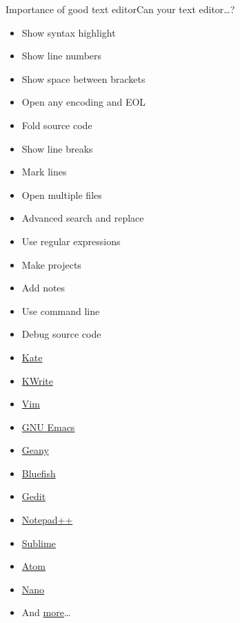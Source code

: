 \documentclass[compress, ucs, xelatex, 11pt, xcolor=svgnames,
  hyperref={
    bookmarks=true,
    unicode=true,
    colorlinks=true,
    pdftitle={Linux, command line and MetaCentrum},
    plainpages=false,
    pdfauthor={Vojtech Zeisek},
    pdfsubject={Course about use of Linux command line, writing shell scripts and using MetaCentrum of CESNET},
    pdfcreator={XeLaTeX},
    pdfkeywords={Linux, GNU, BASH, shell, command line, MetaCentrum},
    linkcolor=DarkRed,
    anchorcolor=DarkBlue,
    citecolor=Indigo,
    filecolor=NavyBlue,
    menucolor=DarkMagenta,
    urlcolor=DarkBlue,
    pdftex},
  url={hyphens, lowtilde} %
  ]{beamer}
\begin{document}
\begin{frame}[label=editors]{Importance of good text editor}{Can your text editor\ldots ?}
\begin{multicols}{2}
  \begin{itemize}
    \item Show syntax highlight
    \item Show line numbers
    \item Show space between brackets
    \item Open any encoding and EOL
    \item Fold source code
    \item Show line breaks
    \item Mark lines
    \item Open multiple files
    \item Advanced search and replace
    \item Use regular expressions
    \item Make projects
    \item Add notes
    \item Use command line
    \item Debug source code
  \end{itemize}
\end{multicols}
\begin{multicols}{4}
  \begin{itemize}
    \item \href{http://kate-editor.org/}{Kate}
    \item \href{https://www.kde.org/applications/utilities/kwrite/}{KWrite}
    \item \href{http://www.vim.org/}{Vim}
    \item \href{https://en.wikipedia.org/wiki/Emacs}{GNU Emacs}
    \item \href{http://www.geany.org/}{Geany}
    \item \href{http://bluefish.openoffice.nl/index.html}{Bluefish}
    \item \href{https://wiki.gnome.org/Apps/Gedit}{Gedit}
    \item \href{https://notepad-plus-plus.org/}{Notepad++}
    \item \href{https://www.sublimetext.com/}{Sublime}
    \item \href{https://atom.io/}{Atom}
    \item \href{http://www.nano-editor.org/}{Nano}
    \item And \href{http://texteditors.org/cgi-bin/wiki.pl?PickingATextEditor}{more}\ldots
  \end{itemize}
\end{multicols}
\end{frame}
\end{document}
